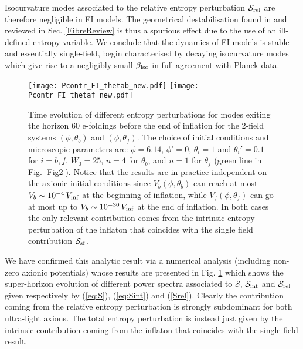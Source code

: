 \documentclass[aps,prd,a4paper,twocolumn,amsmath,showpacs,superscriptaddress,nofootinbib,preprintnumbers]{revtex4-1}
\newcommand{\mc}{\mathcal}
\begin{document}
Isocurvature modes associated to the relative entropy perturbation $\mc{S}_{\rm rel}$ are therefore negligible in FI models. The geometrical destabilisation found in \cite{Cicoli:2018ccr} and reviewed in Sec. \ref{FibreReview} is thus a spurious effect due to the use of an ill-defined entropy variable. We conclude that the dynamics of FI models is stable and essentially single-field, begin characterised by decaying isocurvature modes which give rise to a negligibly small $\beta_{\rm iso}$ in full agreement with Planck data. 

\begin{figure}[!htbp]
\centering
\texttt{[image: Pcontr\_FI\_thetab\_new.pdf]}
\texttt{[image: Pcontr\_FI\_thetaf\_new.pdf]}
\caption{Time evolution of different entropy perturbations for modes exiting the horizon $60$ e-foldings before the end of inflation for the 2-field systems $(\phi,\theta_b)$ and $(\phi,\theta_f)$. The choice of initial conditions and microscopic parameters are: $\phi=6.14$, $\phi'=0$, $\theta_i=1$ and $\theta_i'=0.1$ for $i=b,f$, $W_0=25$, $n=4$ for $\theta_b$, and $n=1$ for $\theta_f$ (green line in Fig. \ref{Fig2}). Notice that the results are in practice independent on the axionic initial conditions since $V_b(\phi,\theta_b)$ can reach at most $V_b\sim 10^{-4}\,V_{\rm inf}$ at the beginning of inflation, while $V_f(\phi,\theta_f)$ can go at most up to $V_b\sim 10^{-30}\,V_{\rm inf}$ at the end of inflation. In both cases the only relevant contribution comes from the intrinsic entropy perturbation of the inflaton that coincides with the single field contribution $\mc{S}_{\rm sf}$.}
\label{fig:entropy}
\end{figure}

We have confirmed this analytic result via a numerical analysis (including non-zero axionic potentials) whose results are presented in Fig. \ref{fig:entropy} which shows the super-horizon evolution of different power spectra associated to $\mc{S}$, $\mc{S}_{\rm int}$ and $\mc{S}_{\rm rel}$ given respectively by (\ref{eq:S}), (\ref{eq:Sint}) and (\ref{Srel}). Clearly the contribution coming from the relative entropy perturbation is strongly subdominant for both ultra-light axions. The total entropy perturbation is instead just given by the intrinsic contribution coming from the inflaton that coincides with the single field result. 
\end{document}
